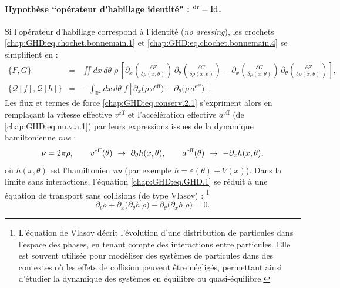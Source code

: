 \paragraph{Hypothèse ``opérateur d’habillage identité'' : $^{\rm dr}=\mathrm{Id}$.}  
Si l’opérateur d’habillage correspond à l’identité (\emph{no dressing}), les crochets \eqref{chap:GHD:eq.chochet.bonnemain.1} et \eqref{chap:GHD:eq.chochet.bonnemain.4} se simplifient en :
\begin{eqnarray}
	\{F,G\} & = &  \iint dx\,d\theta\;\rho \,\left[\partial_x \!\left( \frac{\delta F}{\delta \rho (x , \theta)} \right)\, \partial_\theta \!\left( \frac{\delta G}{\delta \rho (x , \theta)} \right) - \partial_x \!\left( \frac{\delta G}{\delta \rho (x , \theta)} \right) \, \partial_\theta \!\left( \frac{\delta F}{\delta \rho(x , \theta) } \right) \right],\\
	\{\mathcal{Q}[f], \mathcal{Q}[h]\} &=& - \int_{\mathbb{R}^2} dx\, d\theta \; f \left[ \partial_x \big( \rho \, v^{\mathrm{eff}} \big) 
	+ \partial_\theta \big( \rho \, a^{\mathrm{eff}} \big) \right].
\end{eqnarray}
Les flux et termes de force \eqref{chap:GHD:eq.conserv.2.1} s’expriment alors en remplaçant la vitesse effective $v^{\mathrm{eff}}$ et l’accélération effective $a^{\mathrm{eff}}$ (de \eqref{chap:GHD:eq.nu.v.a.1}) par leurs expressions issues de la dynamique hamiltonienne \emph{nue} :
\begin{equation}
	\nu = 2\pi \rho, \qquad v^{\rm eff}(\theta)\ \to\ \partial_\theta h(x,\theta), \qquad a^{\rm eff}(\theta)\ \to\ -\partial_x h(x,\theta),
\end{equation}
où $h(x,\theta)$ est l’hamiltonien \emph{nu} (par exemple $h=\varepsilon(\theta)+V(x)$). 
Dans la limite sans interactions, l’équation \eqref{chap:GHD:eq.GHD.1} se réduit à une équation de transport sans collisions (de type Vlasov) :
\footnote{L'équation de Vlasov décrit l'évolution d'une distribution de particules dans l'espace des phases, en tenant compte des interactions entre particules. Elle est souvent utilisée pour modéliser des systèmes de particules dans des contextes où les effets de collision peuvent être négligés, permettant ainsi d'étudier la dynamique des systèmes en équilibre ou quasi-équilibre.}
\begin{equation}\label{eq:transport-libre}
  \partial_t \rho + \partial_x\!\big( \partial_\theta h\ \rho \big)
  - \partial_\theta\!\big( \partial_x h\ \rho \big) = 0.
\end{equation}

